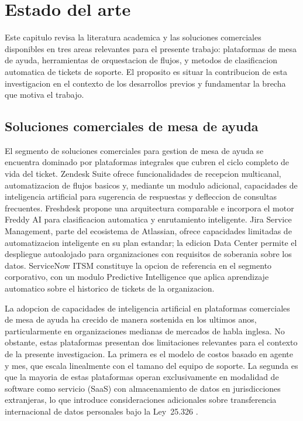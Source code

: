 \section{Estado del arte}

Este capitulo revisa la literatura academica y las soluciones comerciales disponibles en tres areas relevantes para el presente trabajo: plataformas de mesa de ayuda, herramientas de orquestacion de flujos, y metodos de clasificacion automatica de tickets de soporte. El proposito es situar la contribucion de esta investigacion en el contexto de los desarrollos previos y fundamentar la brecha que motiva el trabajo.

\subsection{Soluciones comerciales de mesa de ayuda}

El segmento de soluciones comerciales para gestion de mesa de ayuda se encuentra dominado por plataformas integrales que cubren el ciclo completo de vida del ticket. Zendesk Suite ofrece funcionalidades de recepcion multicanal, automatizacion de flujos basicos y, mediante un modulo adicional, capacidades de inteligencia artificial para sugerencia de respuestas y defleccion de consultas frecuentes. Freshdesk propone una arquitectura comparable e incorpora el motor Freddy AI para clasificacion automatica y enrutamiento inteligente. Jira Service Management, parte del ecosistema de Atlassian, ofrece capacidades limitadas de automatizacion inteligente en su plan estandar; la edicion Data Center permite el despliegue autoalojado para organizaciones con requisitos de soberania sobre los datos. ServiceNow ITSM constituye la opcion de referencia en el segmento corporativo, con un modulo Predictive Intelligence que aplica aprendizaje automatico sobre el historico de tickets de la organizacion.

La adopcion de capacidades de inteligencia artificial en plataformas comerciales de mesa de ayuda ha crecido de manera sostenida en los ultimos anos, particularmente en organizaciones medianas de mercados de habla inglesa. No obstante, estas plataformas presentan dos limitaciones relevantes para el contexto de la presente investigacion. La primera es el modelo de costos basado en agente y mes, que escala linealmente con el tamano del equipo de soporte. La segunda es que la mayoria de estas plataformas operan exclusivamente en modalidad de software como servicio (SaaS) con almacenamiento de datos en jurisdicciones extranjeras, lo que introduce consideraciones adicionales sobre transferencia internacional de datos personales bajo la Ley~25.326 \parencite{Ley25326_2000}.

